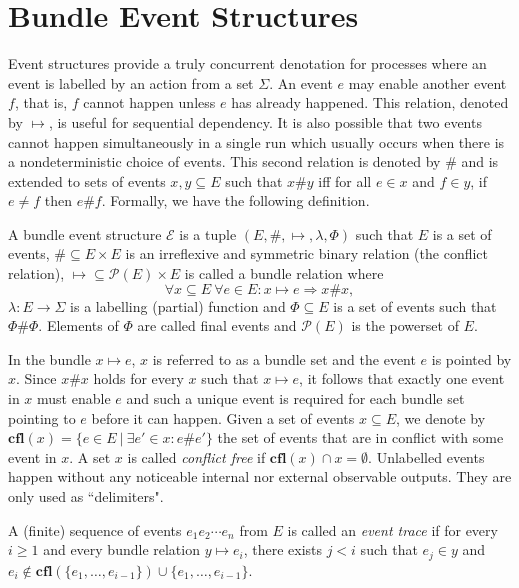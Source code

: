 \documentclass{llncs}
\newcommand{\EE}{\mathcal{E}}
\newcommand{\PP}{\mathcal{P}}
\newcommand{\cfl}{\mathbf{cfl}}
\newcommand{\<}{\langle}
\renewcommand{\>}{\rangle}
\newcommand{\exit}{\Phi}
\begin{document}
\section{Bundle Event Structures}\label{background}

Event structures provide a truly concurrent denotation for processes where an event is labelled by an action from a set $\Sigma$. An event $e$ may enable another event $f$, that is, $f$ cannot happen unless $e$ has already happened. This relation, denoted by $\mapsto$, is useful for sequential dependency. It is also possible that two events cannot happen simultaneously in a single run which usually occurs when there is a nondeterministic choice of events. This second relation is denoted by $\#$ and is extended to sets of events $x,y\subseteq E$ such that $x\#y$ iff for all $e\in x$ and $f\in y$, if $e\neq f$ then $e\#f$. Formally, we have the following definition.
\begin{definition}\label{def:bes}
A bundle event structure $\EE$ is a tuple $(E,\#,\mapsto,\lambda,\exit)$ such that $E$ is a set of events, $\#\subseteq E\times E$ is an irreflexive and symmetric binary relation (the conflict relation), $\mapsto\subseteq\PP(E)\times E$ is called a bundle relation where 
$$\forall x\subseteq E\ \forall e\in E: x\mapsto e\Rightarrow x\#x,$$
$\lambda:E\to\Sigma$ is a labelling (partial) function and $\Phi\subseteq E$ is a set of events such that $\Phi\#\Phi$. Elements of $\Phi$ are called final events and $\PP(E)$ is the powerset of $E$.
\end{definition}

In the bundle $x\mapsto e$, $x$ is referred to as a bundle set and the event $e$ is pointed by $x$. Since $x\#x$ holds for every $x$ such that $x\mapsto e$, it follows that exactly one event in $x$ must enable $e$ and such a unique event is required for each bundle set pointing to $e$ before it can happen. Given a set of events $x\subseteq E$, we denote by $\cfl(x) = \{e\in E\ |\ \exists e'\in x:e\#e'\}$ the set of events that are in conflict with some event in $x$. A set $x$ is called \textit{conflict free} if $\cfl(x)\cap x = \emptyset$. Unlabelled events happen without any noticeable internal nor external observable outputs. They are only used as ``delimiters".

A (finite) sequence of events $e_1e_2\cdots e_n$ from $E$ is called an \emph{event trace} if for every $i\geq 1$ and every bundle relation $y\mapsto e_i$, there exists $j<i$ such that $e_j\in y$ and $e_i\notin\cfl(\{e_1,\dots,e_{i-1}\})\cup\{e_1,\dots,e_{i-1}\}$.
\end{document}
